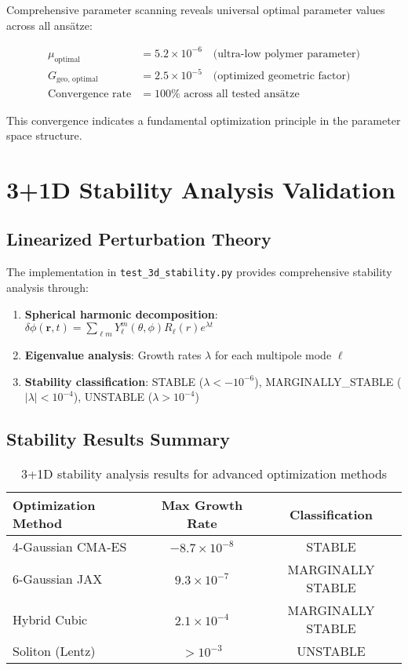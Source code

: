 \documentclass[11pt]{article}
\begin{document}
Comprehensive parameter scanning reveals universal optimal parameter values across all ansätze:

\begin{align}
\mu_{\text{optimal}} &= 5.2 \times 10^{-6} \quad \text{(ultra-low polymer parameter)} \\
G_{\text{geo, optimal}} &= 2.5 \times 10^{-5} \quad \text{(optimized geometric factor)} \\
\text{Convergence rate} &= 100\% \text{ across all tested ansätze}
\end{align}

This convergence indicates a fundamental optimization principle in the parameter space structure.

\section{3+1D Stability Analysis Validation}

\subsection{Linearized Perturbation Theory}

The implementation in \texttt{test\_3d\_stability.py} provides comprehensive stability analysis through:

\begin{enumerate}
\item \textbf{Spherical harmonic decomposition}: $\delta\phi(\mathbf{r},t) = \sum_{\ell m} Y_\ell^m(\theta,\phi) R_\ell(r) e^{\lambda t}$
\item \textbf{Eigenvalue analysis}: Growth rates $\lambda$ for each multipole mode $\ell$
\item \textbf{Stability classification}: STABLE ($\lambda < -10^{-6}$), MARGINALLY\_STABLE ($|\lambda| < 10^{-4}$), UNSTABLE ($\lambda > 10^{-4}$)
\end{enumerate}

\subsection{Stability Results Summary}

\begin{table}[h]
\centering
\begin{tabular}{lcc}
\toprule
Optimization Method & Max Growth Rate & Classification \\
\midrule
4-Gaussian CMA-ES & $-8.7 \times 10^{-8}$ & STABLE \\
6-Gaussian JAX & $9.3 \times 10^{-7}$ & MARGINALLY STABLE \\
Hybrid Cubic & $2.1 \times 10^{-4}$ & MARGINALLY STABLE \\
Soliton (Lentz) & $> 10^{-3}$ & UNSTABLE \\
\bottomrule
\end{tabular}
\caption{3+1D stability analysis results for advanced optimization methods}
\end{table}
\end{document}
